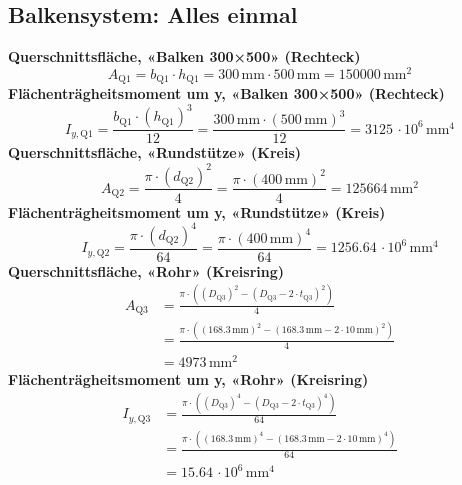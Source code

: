 \documentclass[11pt,a4paper]{article}
\begin{document}
\subsection{Balkensystem: Alles einmal}
\noindent\textbf{Querschnittsfläche, «Balken 300×500» (Rechteck)}
\begin{equation*}
A_{\text{Q1}} = b_{\text{Q1}} \cdot h_{\text{Q1}} = 300\,\mathrm{mm} \cdot 500\,\mathrm{mm} = 150000\,\mathrm{mm}^{2}
\end{equation*}
\noindent\textbf{Flächenträgheitsmoment um y, «Balken 300×500» (Rechteck)}
\begin{equation*}
I_{y,\text{Q1}} = \frac{b_{\text{Q1}} \cdot \left(h_{\text{Q1}}\right)^{3}}{12} = \frac{300\,\mathrm{mm} \cdot \left(500\,\mathrm{mm}\right)^{3}}{12} = 3125\,\cdot 10^{6}\,\mathrm{mm}^{4}
\end{equation*}
\noindent\textbf{Querschnittsfläche, «Rundstütze» (Kreis)}
\begin{equation*}
A_{\text{Q2}} = \frac{\pi \cdot \left(d_{\text{Q2}}\right)^{2}}{4} = \frac{\pi \cdot \left(400\,\mathrm{mm}\right)^{2}}{4} = 125664\,\mathrm{mm}^{2}
\end{equation*}
\noindent\textbf{Flächenträgheitsmoment um y, «Rundstütze» (Kreis)}
\begin{equation*}
I_{y,\text{Q2}} = \frac{\pi \cdot \left(d_{\text{Q2}}\right)^{4}}{64} = \frac{\pi \cdot \left(400\,\mathrm{mm}\right)^{4}}{64} = 1256.64\,\cdot 10^{6}\,\mathrm{mm}^{4}
\end{equation*}
\noindent\textbf{Querschnittsfläche, «Rohr» (Kreisring)}
\begin{equation*}
\begin{aligned}
  A_{\text{Q3}} &= \frac{\pi \cdot \left(\left(D_{\text{Q3}}\right)^{2} - \left(D_{\text{Q3}} - 2 \cdot t_{\text{Q3}}\right)^{2}\right)}{4} \\
  &= \frac{\pi \cdot \left(\left(168.3\,\mathrm{mm}\right)^{2} - \left(168.3\,\mathrm{mm} - 2 \cdot 10\,\mathrm{mm}\right)^{2}\right)}{4} \\
  &= 4973\,\mathrm{mm}^{2}
\end{aligned}
\end{equation*}
\noindent\textbf{Flächenträgheitsmoment um y, «Rohr» (Kreisring)}
\begin{equation*}
\begin{aligned}
  I_{y,\text{Q3}} &= \frac{\pi \cdot \left(\left(D_{\text{Q3}}\right)^{4} - \left(D_{\text{Q3}} - 2 \cdot t_{\text{Q3}}\right)^{4}\right)}{64} \\
  &= \frac{\pi \cdot \left(\left(168.3\,\mathrm{mm}\right)^{4} - \left(168.3\,\mathrm{mm} - 2 \cdot 10\,\mathrm{mm}\right)^{4}\right)}{64} \\
  &= 15.64\,\cdot 10^{6}\,\mathrm{mm}^{4}
\end{aligned}
\end{equation*}
\end{document}
